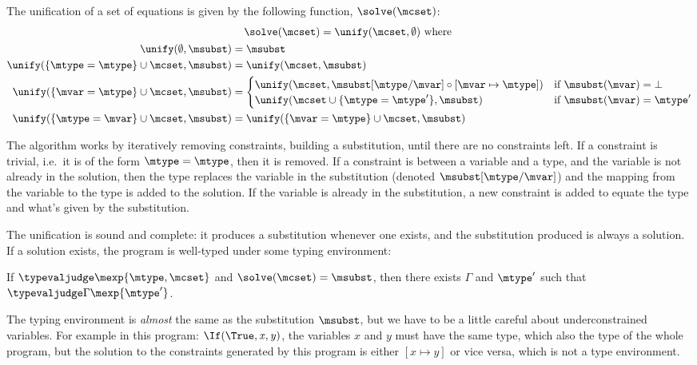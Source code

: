 The unification of a set of equations is given by the following
function, $\solve(\mcset)$:
\begin{gather*}
\solve(\mcset) = \unify(\mcset,\emptyset)\mbox{ where } \\
\begin{align}
\unify(\emptyset,\msubst) &= \msubst\\
\unify(\{\mtype = \mtype\}\cup\mcset,\msubst) &= \unify(\mcset,\msubst)\\
\unify(\{\mvar  = \mtype\}\cup\mcset,\msubst) &=
\begin{cases}
\unify(\mcset,\msubst[\mtype/\mvar] \circ [\mvar \mapsto \mtype]) & \mbox{if }\msubst(\mvar) = \bot\\
\unify(\mcset \cup \{ \mtype=\mtype' \},\msubst) & \mbox{if }\msubst(\mvar) = \mtype'\\
\end{cases}\\
\unify(\{\mtype = \mvar\}\cup\mcset,\msubst) &=
\unify(\{\mvar  = \mtype\}\cup\mcset,\msubst)
\end{align}
\end{gather*}

The algorithm works by iteratively removing constraints, building a
substitution, until there are no constraints left.  If a constraint is
trivial, i.e.~it is of the form $\mtype = \mtype$, then it is removed.
If a constraint is between a variable and a type, and the variable is
not already in the solution, then the type replaces the variable in
the substitution (denoted $\msubst[\mtype/\mvar]$) and the mapping
from the variable to the type is added to the solution.  If the
variable is already in the substitution, a new constraint is added to
equate the type and what's given by the substitution.

The unification is sound and complete: it produces a substitution
whenever one exists, and the substitution produced is always a
solution.  If a solution exists, the program is well-typed under some
typing environment:
\begin{claim}
If $\typevaljudge\relax\mexp{\mtype,\mcset}$ and $\solve(\mcset) =
\msubst$, then there exists $\Gamma$ and $\mtype'$ such that
$\typevaljudge\Gamma\mexp{\mtype'}$.
\end{claim}

The typing environment is \emph{almost} the same as the substitution
$\msubst$, but we have to be a little careful about underconstrained
variables.  For example in this program:
$\If(\True,\mathit{x},\mathit{y})$, the variables $\mathit{x}$ and
$\mathit{y}$ must have the same type, which also the type of the whole
program, but the solution to the constraints generated by this program
is either $[\mathit{x}\mapsto\mathit{y}]$ or vice versa, which is not
a type environment.

